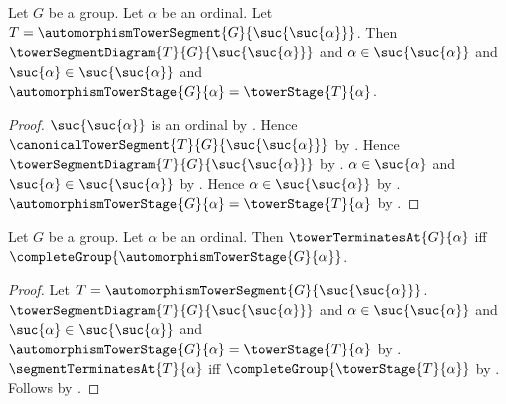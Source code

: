 \begin{proposition}\label{tower_termination_segment_context}
    Let $G$ be a group.
    Let $\alpha$ be an ordinal.
    Let $T=\automorphismTowerSegment{G}{\suc{\suc{\alpha}}}$.
    Then $\towerSegmentDiagram{T}{G}{\suc{\suc{\alpha}}}$ and
        $\alpha\in\suc{\suc{\alpha}}$ and
        $\suc{\alpha}\in\suc{\suc{\alpha}}$ and
        $\automorphismTowerStage{G}{\alpha}=\towerStage{T}{\alpha}$.
\end{proposition}
\begin{proof}
    $\suc{\suc{\alpha}}$ is an ordinal by .
    Hence $\canonicalTowerSegment{T}{G}{\suc{\suc{\alpha}}}$ by
        .
    Hence $\towerSegmentDiagram{T}{G}{\suc{\suc{\alpha}}}$ by
        .
    $\alpha\in\suc{\alpha}$ and
        $\suc{\alpha}\in\suc{\suc{\alpha}}$ by
        .
    Hence $\alpha\in\suc{\suc{\alpha}}$ by
        .
    $\automorphismTowerStage{G}{\alpha}=\towerStage{T}{\alpha}$ by
        .
\end{proof}

\begin{theorem}\label{tower_terminates_at_iff_complete}
    Let $G$ be a group.
    Let $\alpha$ be an ordinal.
    Then $\towerTerminatesAt{G}{\alpha}$ iff
        $\completeGroup{\automorphismTowerStage{G}{\alpha}}$.
\end{theorem}
\begin{proof}
    Let $T=\automorphismTowerSegment{G}{\suc{\suc{\alpha}}}$.
    $\towerSegmentDiagram{T}{G}{\suc{\suc{\alpha}}}$ and
        $\alpha\in\suc{\suc{\alpha}}$ and
        $\suc{\alpha}\in\suc{\suc{\alpha}}$ and
        $\automorphismTowerStage{G}{\alpha}=\towerStage{T}{\alpha}$ by
        .
    $\segmentTerminatesAt{T}{\alpha}$ iff
        $\completeGroup{\towerStage{T}{\alpha}}$ by
        .
    Follows by .
\end{proof}
